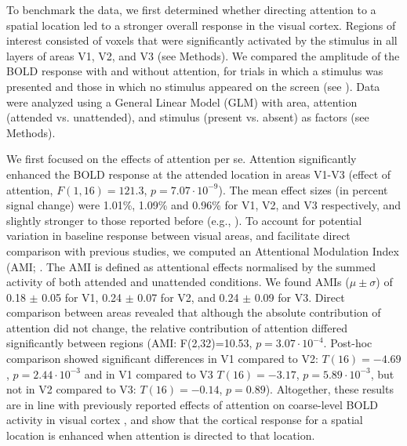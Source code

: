 \documentclass[9pt,lineno]{aperture}
\begin{document}
To benchmark the data, we first determined whether directing attention to a spatial location led to a stronger overall response in the visual cortex. Regions of interest consisted of voxels that were significantly activated by the stimulus in all layers of areas V1, V2, and V3 (see Methods). We compared the amplitude of the BOLD response with and without attention, for trials in which a stimulus was presented and those in which no stimulus appeared on the screen (see ). Data were analyzed using a General Linear Model (GLM) with area, attention (attended vs. unattended), and stimulus (present vs. absent) as factors (see Methods).

We first focused on the effects of attention per se. Attention significantly enhanced the BOLD response at the attended location in areas V1-V3 (effect of attention, $F(1,16)=121.3$, $p=7.07 \cdot 10^{-9}$). The mean effect sizes (in percent signal change) were 1.01\%, 1.09\% and 0.96\% for V1, V2, and V3 respectively, and slightly stronger to those reported before (e.g., \citet{Murray2008,Jehee2011,Sprague2013}). To account for potential variation in baseline response between visual areas, and facilitate direct comparison with previous studies, we computed an Attentional Modulation Index (AMI; \citep{Kastner1999}. The AMI is defined as attentional effects normalised by the summed activity of both attended and unattended conditions. We found AMIs ($\mu \pm \sigma$) of 0.18 $\pm$ 0.05 for V1, 0.24 $\pm$ 0.07 for V2, and 0.24 $\pm$ 0.09 for V3. Direct comparison between areas revealed that although the absolute contribution of attention did not change, the relative contribution of attention differed significantly between regions (AMI: F(2,32)=10.53, $p=3.07 \cdot 10^{-4}$. Post-hoc comparison showed significant differences in V1 compared to V2: $T(16)=-4.69$, $p=2.44 \cdot 10^{-3}$ and in V1 compared to V3 $T(16)=-3.17$, $p=5.89 \cdot 10^{-3}$, but not in V2 compared to V3: $T(16)=-0.14$, $p=0.89$). Altogether, these results are  in line with previously reported effects of attention on coarse-level BOLD activity in visual cortex \citep{Somers1999,Gandhi1999}, and show that the cortical response for a spatial location is enhanced when attention is directed to that location.
\end{document}
